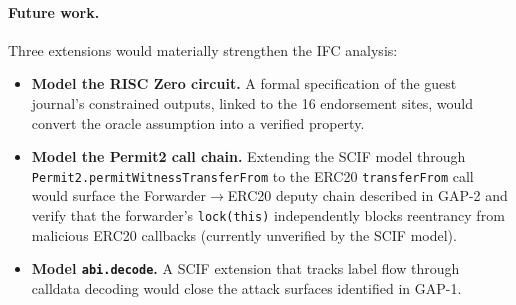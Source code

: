 \documentclass[11pt,a4paper]{article}
\begin{document}
\paragraph{Future work.}
Three extensions would materially strengthen the IFC analysis:
\begin{itemize}
  \item \textbf{Model the RISC Zero circuit.} A formal specification of the
    guest journal's constrained outputs, linked to the 16 endorsement sites,
    would convert the oracle assumption into a verified property.
  \item \textbf{Model the Permit2 call chain.} Extending the SCIF model through
    \texttt{Permit2.permitWitnessTransferFrom} to the ERC20 \texttt{transferFrom}
    call would surface the Forwarder$\to$ERC20 deputy chain described in GAP-2
    and verify that the forwarder's \texttt{lock(this)} independently blocks
    reentrancy from malicious ERC20 callbacks (currently unverified by the SCIF
    model).
  \item \textbf{Model \texttt{abi.decode}.} A SCIF extension that tracks label
    flow through calldata decoding would close the attack surfaces identified
    in GAP-1.
\end{itemize}

\end{document}
